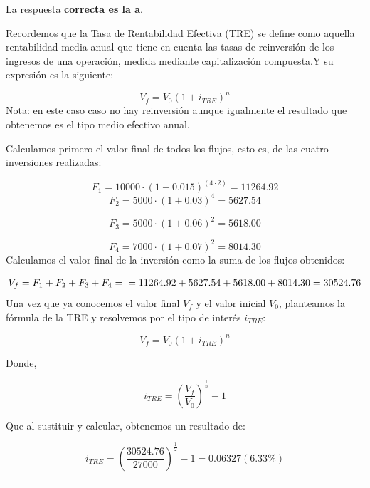 \documentclass[
  letterpaper,
  DIV=11,
  numbers=noendperiod]{scrreprt}
\begin{document}
\begin{tcolorbox}[enhanced jigsaw, left=2mm, opacityback=0, colback=white, breakable, arc=.35mm, bottomrule=.15mm, rightrule=.15mm, toprule=.15mm, leftrule=.75mm, colframe=quarto-callout-tip-color-frame]
\begin{minipage}[t]{5.5mm}
\textcolor{quarto-callout-tip-color}{\faLightbulb}
\end{minipage}%
\begin{minipage}[t]{\textwidth - 5.5mm}

La respuesta \textbf{correcta es la a}.

Recordemos que la Tasa de Rentabilidad Efectiva (TRE) se define como
aquella rentabilidad media anual que tiene en cuenta las tasas de
reinversión de los ingresos de una operación, medida mediante
capitalización compuesta.Y su expresión es la siguiente:

\[V_f=V_0\left(1+i_{TRE}\right)^n\] Nota: en este caso caso no hay
reinversión aunque igualmente el resultado que obtenemos es el tipo
medio efectivo anual.

Calculamos primero el valor final de todos los flujos, esto es, de las
cuatro inversiones realizadas:

\[F_1=10000\cdot(1+0.015)^{(4\cdot2)}=11264.92\]
\[F_2=5000\cdot(1+0.03)^{4}=5627.54\]

\[F_3=5000\cdot(1+0.06)^{2}=5618.00\]

\[F_4=7000\cdot(1+0.07)^{2}=8014.30\] Calculamos el valor final de la
inversión como la suma de los flujos obtenidos:

\[V_f=F_1+F_2+F_3+F_4=\\=11264.92+5627.54+5618.00+8014.30=30524.76\] Una
vez que ya conocemos el valor final \(V_f\) y el valor inicial \(V_0\),
planteamos la fórmula de la TRE y resolvemos por el tipo de interés
\(i_{TRE}\):

\[V_f=V_0\left(1+i_{TRE}\right)^n\]

Donde,

\[i_{TRE}=\left(\frac{V_f }{V_0 }\right)^{\frac{1 }{n }}-1\]

Que al sustituir y calcular, obtenemos un resultado de:

\[i_{TRE}=\left(\frac{30524.76}{27000 }\right)^{\frac{1 }{2 }}-1=0.06327(6.33\%)\]

\end{minipage}%
\end{tcolorbox}

\begin{center}\rule{0.5\linewidth}{0.5pt}\end{center}
\end{document}
